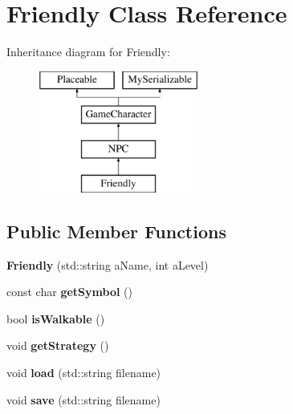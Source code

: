 \hypertarget{class_friendly}{}\section{Friendly Class Reference}
\label{class_friendly}
Inheritance diagram for Friendly\+:\begin{figure}[H]
\begin{center}
\leavevmode
\includegraphics[height=4.000000cm]{class_friendly}
\end{center}
\end{figure}
\subsection*{Public Member Functions}
\begin{DoxyCompactItemize}
\item 
\hypertarget{class_friendly_a71ef9a37d8c605ca40afa4cb42567496}{}\label{class_friendly_a71ef9a37d8c605ca40afa4cb42567496} 
{\bfseries Friendly} (std\+::string a\+Name, int a\+Level)
\item 
\hypertarget{class_friendly_adfd4d820cd16e8fd32877b19a040ea1d}{}\label{class_friendly_adfd4d820cd16e8fd32877b19a040ea1d} 
const char {\bfseries get\+Symbol} ()
\item 
\hypertarget{class_friendly_aa309d676f0034511f83386108798c1e2}{}\label{class_friendly_aa309d676f0034511f83386108798c1e2} 
bool {\bfseries is\+Walkable} ()
\item 
\hypertarget{class_friendly_a4fe8e4947182ee452ecb67b1a5da81e8}{}\label{class_friendly_a4fe8e4947182ee452ecb67b1a5da81e8} 
void {\bfseries get\+Strategy} ()
\item 
\hypertarget{class_friendly_a1445b856d8c440c3bee4dc1ae63c0b4f}{}\label{class_friendly_a1445b856d8c440c3bee4dc1ae63c0b4f} 
void {\bfseries load} (std\+::string filename)
\item 
\hypertarget{class_friendly_ab757441afa46a0928dc52da262318699}{}\label{class_friendly_ab757441afa46a0928dc52da262318699} 
void {\bfseries save} (std\+::string filename)
\end{DoxyCompactItemize}
